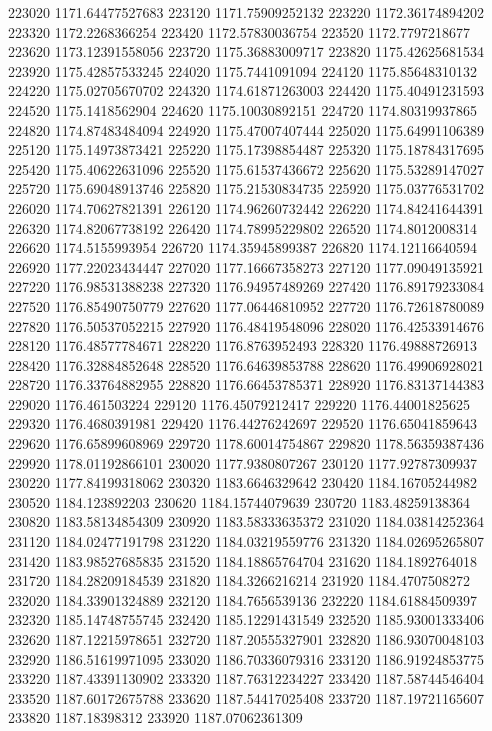 {223020 1171.64477527683
223120 1171.75909252132
223220 1172.36174894202
223320 1172.2268366254
223420 1172.57830036754
223520 1172.7797218677
223620 1173.12391558056
223720 1175.36883009717
223820 1175.42625681534
223920 1175.42857533245
224020 1175.7441091094
224120 1175.85648310132
224220 1175.02705670702
224320 1174.61871263003
224420 1175.40491231593
224520 1175.1418562904
224620 1175.10030892151
224720 1174.80319937865
224820 1174.87483484094
224920 1175.47007407444
225020 1175.64991106389
225120 1175.14973873421
225220 1175.17398854487
225320 1175.18784317695
225420 1175.40622631096
225520 1175.61537436672
225620 1175.53289147027
225720 1175.69048913746
225820 1175.21530834735
225920 1175.03776531702
226020 1174.70627821391
226120 1174.96260732442
226220 1174.84241644391
226320 1174.82067738192
226420 1174.78995229802
226520 1174.8012008314
226620 1174.5155993954
226720 1174.35945899387
226820 1174.12116640594
226920 1177.22023434447
227020 1177.16667358273
227120 1177.09049135921
227220 1176.98531388238
227320 1176.94957489269
227420 1176.89179233084
227520 1176.85490750779
227620 1177.06446810952
227720 1176.72618780089
227820 1176.50537052215
227920 1176.48419548096
228020 1176.42533914676
228120 1176.48577784671
228220 1176.8763952493
228320 1176.49888726913
228420 1176.32884852648
228520 1176.64639853788
228620 1176.49906928021
228720 1176.33764882955
228820 1176.66453785371
228920 1176.83137144383
229020 1176.461503224
229120 1176.45079212417
229220 1176.44001825625
229320 1176.4680391981
229420 1176.44276242697
229520 1176.65041859643
229620 1176.65899608969
229720 1178.60014754867
229820 1178.56359387436
229920 1178.01192866101
230020 1177.9380807267
230120 1177.92787309937
230220 1177.84199318062
230320 1183.6646329642
230420 1184.16705244982
230520 1184.123892203
230620 1184.15744079639
230720 1183.48259138364
230820 1183.58134854309
230920 1183.58333635372
231020 1184.03814252364
231120 1184.02477191798
231220 1184.03219559776
231320 1184.02695265807
231420 1183.98527685835
231520 1184.18865764704
231620 1184.1892764018
231720 1184.28209184539
231820 1184.3266216214
231920 1184.4707508272
232020 1184.33901324889
232120 1184.7656539136
232220 1184.61884509397
232320 1185.14748755745
232420 1185.12291431549
232520 1185.93001333406
232620 1187.12215978651
232720 1187.20555327901
232820 1186.93070048103
232920 1186.51619971095
233020 1186.70336079316
233120 1186.91924853775
233220 1187.43391130902
233320 1187.76312234227
233420 1187.58744546404
233520 1187.60172675788
233620 1187.54417025408
233720 1187.19721165607
233820 1187.18398312
233920 1187.07062361309
}
